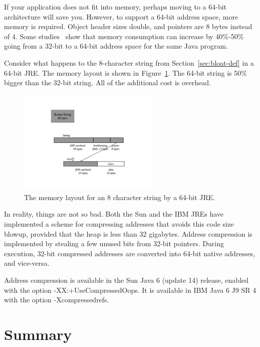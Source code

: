 If your application does not fit into memory, perhaps moving to a 64-bit architecture will save you. However, to support a 64-bit address space, more memory is required. Object header sizes double, and pointers are 8 bytes instead of 4. Some studies~\cite{compressedAddress} show that memory consumption can increase by 40\%-50\% going from a 32-bit to a 64-bit address space for the same Java program.
\begin{example} 
Consider what happens to the 8-character string from Section~\ref{sec:bloat-def} in a 64-bit JRE. The memory layout is shown in Figure~\ref{fig:8-char-string-64-bit}. The 64-bit string is 50\% bigger than the 32-bit string. All of the additional cost is overhead.

\end{example} 
 \begin{figure}
  \centering
 \includegraphics[width=0.6\textwidth]{Figures/chapter4/8-char-string-64-bit.pdf}
  \caption{The memory layout for an 8 character string by a 64-bit JRE.}
  \label{fig:8-char-string-64-bit}
\end{figure}

In reality, things are not so bad. Both the Sun and the IBM JREs have implemented a scheme for compressing addresses that avoids this code size blowup, provided that the heap is less than 32 gigabytes. Address compression is implemented by stealing a few unused bits from 32-bit pointers. During execution, 32-bit compressed addresses are converted into 64-bit native addresses, and vice-versa. 

Address compression is available in the Sun Java 6 (update 14) release, enabled with the option -XX:+UseCompressedOops. It is available in IBM Java 6 J9 SR 4 with the option -Xcompressedrefs.

\section{Summary}

